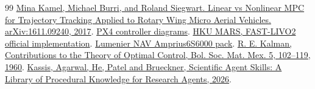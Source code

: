 \documentclass[a4paper,11pt]{article}
\begin{document}
\begin{thebibliography}{99}
 \href{https://arxiv.org/abs/1611.09240}{Mina Kamel, Michael Burri, and Roland Siegwart. Linear vs Nonlinear MPC for Trajectory Tracking Applied to Rotary Wing Micro Aerial Vehicles. arXiv:1611.09240, 2017}.
 \href{https://docs.px4.io/main/en/flight_stack/controller_diagrams}{PX4 controller diagrams}.
 \href{https://github.com/hku-mars/FAST-LIVO2}{HKU MARS, FAST-LIVO2 official implementation}.
 \href{https://www.lumenier.com/products/lumenier-nav-6000mah-6s-21700-amprius-lithium-ion-battery-xt60}{Lumenier NAV Amprius6S6000 pack}.
 \href{https://liberzon.csl.illinois.edu/teaching/kalman_paper.pdf}{R. E. Kalman, Contributions to the Theory of Optimal Control, Bol. Soc. Mat. Mex. 5, 102–119, 1960}.
 \href{https://arxiv.org/abs/2609.00065}{Kassis, Agarwal, He, Patel and Brueckner, Scientific Agent Skills: A Library of Procedural Knowledge for Research Agents, 2026}.
\end{thebibliography}
\end{document}
